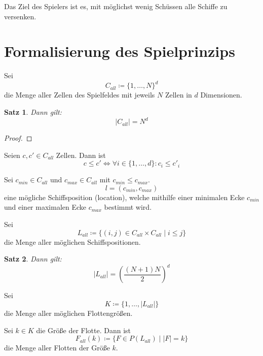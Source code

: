 \documentclass[a4paper,12pt]{llncs}
\numberwithin{equation}{section}
\newtheorem{satz}{Satz}
\begin{document}
Das Ziel des Spielers ist es, mit möglichst wenig Schüssen alle Schiffe zu versenken.

\section{Formalisierung des Spielprinzips}

\begin{definition}
Sei
\[
C_{all} \coloneqq \{1, \dots, N\}^d
\]
die Menge aller Zellen des Spielfeldes mit jeweils $N$ Zellen in $d$ Dimensionen.
\end{definition}

\begin{satz}
Dann gilt:
\[
|C_{all}|=N^d
\]
\end{satz}

\begin{proof}
\end{proof}

\begin{definition}
Seien $c, c' \in C_{all}$ Zellen.
Dann ist
\[
c \leq c' \Leftrightarrow \forall i \in \{1, \dots, d\} \colon c_{i} \leq c'_{i} 
\]
\end{definition}

\begin{definition}
Sei $c_{min} \in C_{all}$ und $c_{max} \in C_{all}$ mit $c_{min} \leq c_{max}$.
\[
l=(c_{min}, c_{max})
\]
eine mögliche Schiffsposition (location), welche mithilfe einer minimalen Ecke $c_{min}$ und einer maximalen Ecke $c_{max}$ bestimmt wird.
\end{definition}

\begin{definition}
Sei 
\[
L_{all} \coloneqq
\{
(i, j) \in C_{all} \times C_{all}
\mid
i \leq j
\}
\] die Menge aller möglichen Schiffspositionen.
\end{definition}

\begin{satz}
Dann gilt:
\[
|L_{all}|=\left(\frac{(N+1) N}{2}\right)^d
\]
\end{satz}

\begin{definition}
Sei 
\[
K \coloneqq \{1, \dots, |L_{all}|\}
\]
die Menge aller möglichen Flottengrößen.
\end{definition}

\begin{definition}
Sei $k \in K$ die Größe der Flotte.
Dann ist
\[
F_{all}(k) \coloneqq\{F \in P(L_{all}) \mid |F| = k\}
\]
die Menge aller Flotten der Größe $k$.
\end{definition}
\end{document}
